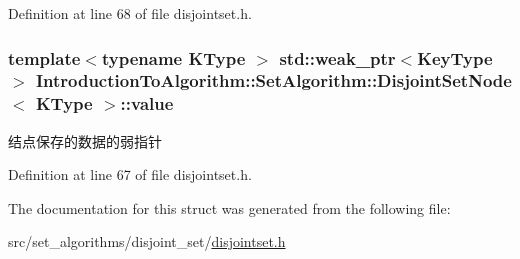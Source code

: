 Definition at line 68 of file disjointset.\+h.

\hypertarget{struct_introduction_to_algorithm_1_1_set_algorithm_1_1_disjoint_set_node_ae01535aa5e8ba05dceedd5c475d61c18}{}
\subsubsection[{value}]{\setlength{\rightskip}{0pt plus 5cm}template$<$typename K\+Type $>$ std\+::weak\+\_\+ptr$<${\bf Key\+Type}$>$ {\bf Introduction\+To\+Algorithm\+::\+Set\+Algorithm\+::\+Disjoint\+Set\+Node}$<$ K\+Type $>$\+::value}\label{struct_introduction_to_algorithm_1_1_set_algorithm_1_1_disjoint_set_node_ae01535aa5e8ba05dceedd5c475d61c18}
结点保存的数据的弱指针 

Definition at line 67 of file disjointset.\+h.



The documentation for this struct was generated from the following file\+:\begin{DoxyCompactItemize}
\item 
src/set\+\_\+algorithms/disjoint\+\_\+set/\hyperlink{disjointset_8h}{disjointset.\+h}\end{DoxyCompactItemize}
